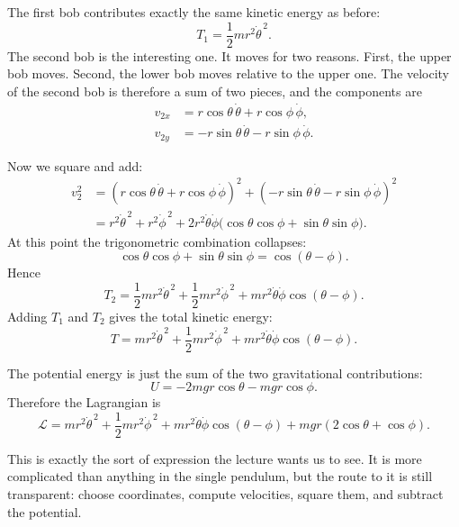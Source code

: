 The first bob contributes exactly the same kinetic energy as before:
\begin{equation}
T_1=\frac12 mr^2\dot\theta^{\,2}.
\end{equation}
The second bob is the interesting one. It moves for two reasons. First, the upper bob moves. Second, the lower bob moves relative to the upper one. The velocity of the second bob is therefore a sum of two pieces, and the components are
\begin{align}
v_{2x} &= r\cos\theta\,\dot\theta+r\cos\phi\,\dot\phi,\\
v_{2y} &= -r\sin\theta\,\dot\theta-r\sin\phi\,\dot\phi.
\end{align}

Now we square and add:
\begin{align}
v_2^2
&=
\left(r\cos\theta\,\dot\theta+r\cos\phi\,\dot\phi\right)^2
+
\left(-r\sin\theta\,\dot\theta-r\sin\phi\,\dot\phi\right)^2\\
&=
r^2\dot\theta^{\,2}
+
r^2\dot\phi^{\,2}
+
2r^2\dot\theta\dot\phi
\bigl(\cos\theta\cos\phi+\sin\theta\sin\phi\bigr).
\end{align}
At this point the trigonometric combination collapses:
\begin{equation}
\cos\theta\cos\phi+\sin\theta\sin\phi=\cos(\theta-\phi).
\end{equation}
Hence
\begin{equation}
T_2
=
\frac12 mr^2\dot\theta^{\,2}
+
\frac12 mr^2\dot\phi^{\,2}
+
mr^2\dot\theta\dot\phi\cos(\theta-\phi).
\end{equation}
Adding \(T_1\) and \(T_2\) gives the total kinetic energy:
\begin{equation}
T
=
mr^2\dot\theta^{\,2}
+
\frac12 mr^2\dot\phi^{\,2}
+
mr^2\dot\theta\dot\phi\cos(\theta-\phi).
\end{equation}

The potential energy is just the sum of the two gravitational contributions:
\begin{equation}
U=-2mgr\cos\theta-mgr\cos\phi.
\end{equation}
Therefore the Lagrangian is
\begin{equation}
\mathcal{L}
=
mr^2\dot\theta^{\,2}
+
\frac12 mr^2\dot\phi^{\,2}
+
mr^2\dot\theta\dot\phi\cos(\theta-\phi)
+
mgr(2\cos\theta+\cos\phi).
\end{equation}

This is exactly the sort of expression the lecture wants us to see. It is more complicated than anything in the single pendulum, but the route to it is still transparent: choose coordinates, compute velocities, square them, and subtract the potential.

